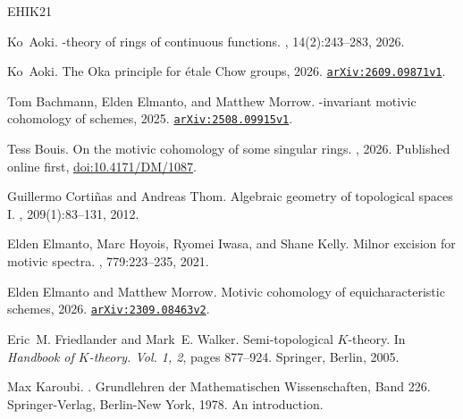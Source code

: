 \documentclass[11pt,a4paper]{amsart}
\numberwithin{equation}{section}
\theoremstyle{plain}
\theoremstyle{definition}
\theoremstyle{remark}
\let\oldAA\AA\let\AA\relax
\let\oldSS\SS\let\SS\relax
\newcommand{\SS}{\mathbf{S}}
\newcommand{\AA}{\mathbb{A}}
\begin{document}

\let\AA\oldAA \let\SS\oldSS  \newcommand{\yyyy}[1]{}
\begin{thebibliography}{EHIK21}

Ko~Aoki.
-theory of rings of continuous functions.
, 14(2):243--283, 2026.

Ko~Aoki.
\newblock The {O}ka principle for \'{e}tale {C}how groups, 2026.
\newblock \href{https://arxiv.org/abs/2609.09871v1}{\tt arXiv:2609.09871v1}.

Tom Bachmann, Elden Elmanto, and Matthew Morrow.
-invariant motivic cohomology of schemes, 2025.
\newblock \href{https://arxiv.org/abs/2508.09915v1}{\tt arXiv:2508.09915v1}.

Tess Bouis.
\newblock On the motivic cohomology of some singular rings.
, 2026.
\newblock Published online first, \href{https://doi.org/10.4171/DM/1087}{doi:10.4171/DM/1087}.

Guillermo Corti{\~n}as and Andreas Thom.
\newblock Algebraic geometry of topological spaces {I}.
, 209(1):83--131, 2012.

Elden Elmanto, Marc Hoyois, Ryomei Iwasa, and Shane Kelly.
\newblock Milnor excision for motivic spectra.
, 779:223--235, 2021.

Elden Elmanto and Matthew Morrow.
\newblock Motivic cohomology of equicharacteristic schemes, 2026.
\newblock \href{https://arxiv.org/abs/2309.08463v2}{\tt arXiv:2309.08463v2}.

Eric~M. Friedlander and Mark~E. Walker.
\newblock Semi-topological {$K$}-theory.
\newblock In {\em Handbook of {$K$}-theory. {V}ol. 1, 2}, pages 877--924. Springer, Berlin, 2005.

Max Karoubi.
.
\newblock Grundlehren der Mathematischen Wissenschaften, Band 226. Springer-Verlag, Berlin-New York, 1978.
\newblock An introduction.

\end{thebibliography}
 
\end{document}
